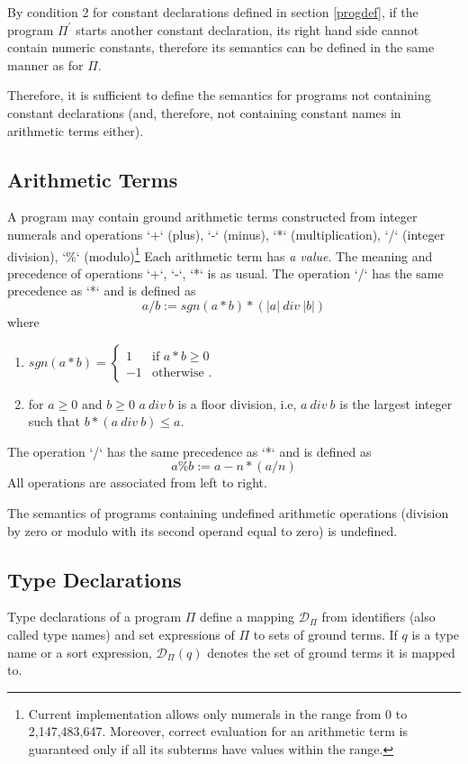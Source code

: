\documentclass[a4paper,10pt]{article}
\begin{document}
\medskip\noindent
By condition 2 for constant declarations defined in section \ref{progdef}, if the program $\Pi^\prime$ starts another constant declaration, its right hand side cannot contain numeric constants, therefore its semantics can be defined in the same manner as for $\Pi$.
 
\medskip\noindent
Therefore, it is sufficient to define the semantics for programs not containing constant declarations (and, therefore, not containing constant names in arithmetic terms either).

\subsection{Arithmetic Terms}\label{at}

A program may contain ground arithmetic terms constructed from integer numerals and operations `+` (plus),  `-` (minus), `*` (multiplication), `/` (integer division), `\%` (modulo)\footnote{Current implementation allows only numerals in the range from 0 to 2,147,483,647. Moreover, correct evaluation for an arithmetic term is guaranteed only if all its subterms have values within the range.} Each arithmetic term  has \textit{a value}. 
The meaning and precedence of operations  `+`,  `-`, `*` is as usual. The  operation `/` has the same precedence as `*` and is defined as $$a/b := sgn(a*b) *(|a|~div~|b|)$$
where 
\begin{enumerate}
\item $sgn(a*b) = \begin{cases} 1 &\mbox{if } a *b \ge 0 \\
-1 & \mbox{otherwise }. \end{cases} $
\item for $a\ge 0$ and $b\ge0$ $a~div~b$ is a floor division, i.e, $a~div~b$ is the largest integer such that $b * (a~div~b)  \le  a$.
\end{enumerate}
The  operation `/` has the same precedence as `*` and is defined as $$a\%b := a - n * (a/n) $$
All operations are associated from left to right. 


\medskip\noindent
The semantics of programs containing undefined arithmetic operations (division by zero or modulo with its second operand equal to zero) is undefined.  

  


\subsection{Type Declarations} \label{types}
Type declarations of a program $\Pi$  define a mapping $\mathcal{D}_\Pi$ from identifiers (also called type names) and set expressions of $\Pi$  to sets of ground terms. If $q$ is a type name or a sort expression, $\mathcal{D}_\Pi(q)$  denotes the set of ground terms it is mapped to. 
\end{document}
